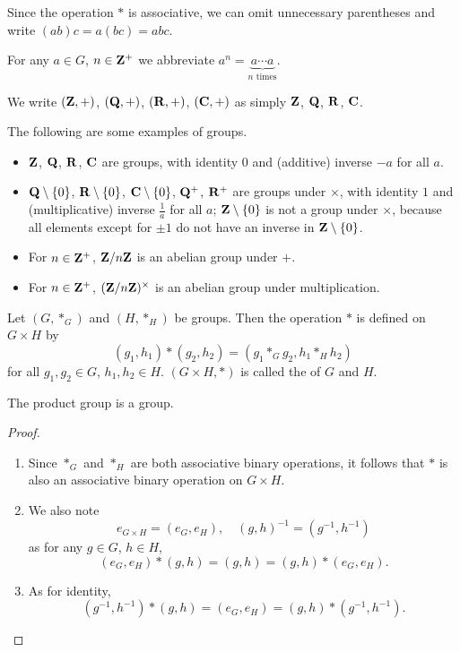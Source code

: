 \begin{notation}
Since the operation $\ast$ is associative, we can omit unnecessary parentheses and write $(ab)c=a(bc)=abc$.
\end{notation}

\begin{notation}
For any $a\in G$, $n\in\mathbf Z^+$ we abbreviate $a^n=\underbrace{a\cdots a}_\text{$n$ times}$.
\end{notation}

\begin{notation}
We write $(\mathbf Z,+)$, $(\mathbf Q,+)$, $(\mathbf R,+)$, $(\mathbf C,+)$ as simply $\mathbf Z$, $\mathbf Q$, $\mathbf R$, $\mathbf C$.
\end{notation}

\begin{example}
The following are some examples of groups.
\begin{itemize}
\item $\mathbf Z$, $\mathbf Q$, $\mathbf R$, $\mathbf C$ are groups, with identity $0$ and (additive) inverse $-a$ for all $a$.
\item $\mathbf Q\setminus\{0\}$, $\mathbf R\setminus\{0\}$, $\mathbf C\setminus\{0\}$, $\mathbf Q^+$, $\mathbf R^+$ are groups under $\times$, with identity $1$ and (multiplicative) inverse $\frac{1}{a}$ for all $a$; $\mathbf Z\setminus\{0\}$ is not a group under $\times$, because all elements except for $\pm1$ do not have an inverse in $\mathbf Z\setminus\{0\}$.
\item For $n\in\mathbf Z^+$, $\mathbf Z/n\mathbf Z$ is an abelian group under $+$.
\item For $n\in\mathbf Z^+$, $(\mathbf Z/n\mathbf Z)^\times$ is an abelian group under multiplication.
\end{itemize}
\end{example}

\begin{definition}
Let $(G,\ast_G)$ and $(H,\ast_H)$ be groups. Then the operation $\ast$ is defined on $G\times H$ by
\[(g_1,h_1)\ast(g_2,h_2)=(g_1\ast_G g_2,h_1\ast_H h_2)\]
for all $g_1,g_2\in G$, $h_1,h_2\in H$. $(G\times H, \ast)$ is called the  of $G$ and $H$.
\end{definition}

\begin{proposition}
The product group is a group.
\end{proposition}
    
\begin{proof} \
\begin{enumerate}[label=(\arabic*)]
\item Since $\ast_G$ and $\ast_H$ are both associative binary operations, it follows that $\ast$ is also an associative binary operation on $G \times H$.
\item We also note
\[e_{G\times H}=(e_G,e_H),\quad(g,h)^{-1}=(g^{-1},h^{-1})\]
as for any $g \in G$, $h \in H$,
\[(e_G,e_H)\ast(g,h)=(g,h)=(g,h)\ast(e_G,e_H).\]
\item As for identity,
\[(g^{-1},h^{-1})\ast(g,h)=(e_G,e_H)=(g,h)\ast(g^{-1},h^{-1}).\]
\end{enumerate}
\end{proof}

